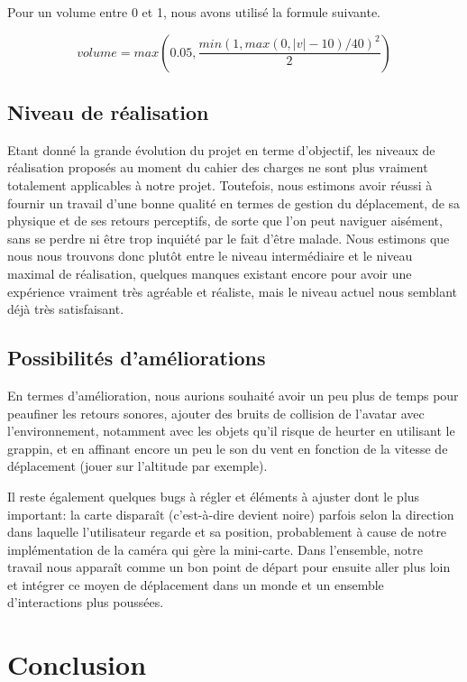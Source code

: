 \documentclass[a4paper]{elsarticle}
\begin{document}
Pour un volume entre 0 et 1, nous avons utilisé la formule suivante.

\begin{equation}
volume = max\left(0.05, \frac{min(1, max(0, |v| - 10) / 40)^{2}}{2}\right)
\end{equation}

\subsection{Niveau de réalisation}

Etant donné la grande évolution du projet en terme d’objectif, les niveaux de réalisation proposés au moment du cahier des charges ne sont plus vraiment totalement applicables à notre projet. Toutefois, nous estimons avoir réussi à fournir un travail d’une bonne qualité en termes de gestion du déplacement, de sa physique et de ses retours perceptifs, de sorte que l’on peut naviguer aisément, sans se perdre ni être trop inquiété par le fait d’être malade. Nous estimons que nous nous trouvons donc plutôt entre le niveau intermédiaire et le niveau maximal de réalisation, quelques manques existant encore pour avoir une expérience vraiment très agréable et réaliste, mais le niveau actuel nous semblant déjà très satisfaisant.

\subsection{Possibilités d’améliorations}

En termes d’amélioration, nous aurions souhaité avoir un peu plus de temps pour peaufiner les retours sonores, ajouter des bruits de collision de l’avatar avec l’environnement, notamment avec les objets qu’il risque de heurter en utilisant le grappin, et en affinant encore un peu le son du vent en fonction de la vitesse de déplacement (jouer sur l’altitude par exemple).

Il reste également quelques bugs à régler et éléments à ajuster dont le plus important: la carte disparaît (c’est-à-dire devient noire) parfois selon la direction dans laquelle l’utilisateur regarde et sa position, probablement à cause de notre implémentation de la caméra qui gère la mini-carte.
Dans l’ensemble, notre travail nous apparaît comme un bon point de départ pour ensuite aller plus loin et intégrer ce moyen de déplacement dans un monde et un ensemble d’interactions plus poussées.

\section{Conclusion}
\end{document}
